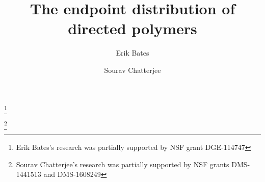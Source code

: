 \documentclass[11pt,reqno]{amsart}
\numberwithin{equation}{section}
\theoremstyle{definition}
\begin{document}


\title{The endpoint distribution of directed polymers}



\author{Erik Bates}
\thanks{Erik Bates's research was partially supported by NSF grant DGE-114747} 
\address{\newline Department of Mathematics \newline Stanford University  Serra Mall, Bldg 380 \newline Stanford, CA 94305 \newline \textup{\tt ewbates@stanford.edu}}

\author{Sourav Chatterjee}
\thanks{Sourav Chatterjee's research was partially supported by NSF grants DMS-1441513 and DMS-1608249}

\address{\newline Department of Statistics \newline Stanford University\newline Sequoia Hall, 390 Serra Mall \newline Stanford, CA 94305\newline \textup{\tt souravc@stanford.edu}}
\end{document}
